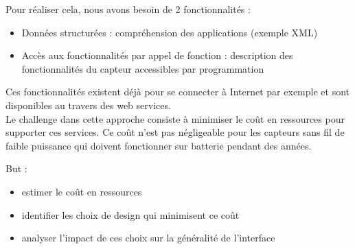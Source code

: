 \begin{frame}
Pour réaliser cela, nous avons besoin de 2 fonctionnalités :
\begin{itemize}
\item Données structurées : compréhension des applications (exemple XML)
\item Accès aux fonctionnalités par appel de fonction : description des fonctionnalités du capteur accessibles par programmation
\end{itemize}
Ces fonctionnalités existent déjà pour se connecter à Internet par exemple et sont disponibles au travers des web services.\\ Le challenge dans cette approche consiste à minimiser le coût en ressources pour supporter ces services. Ce coût n'est pas négligeable pour les capteurs sans fil de faible puissance qui doivent fonctionner sur batterie pendant des années.
\end{frame}

\begin{frame}
But : 
\begin{itemize}
\item estimer le coût en ressources
\item identifier les choix de design qui minimisent ce coût
\item analyser l'impact de ces choix sur la généralité de l'interface
\end{itemize}

\end{frame}

